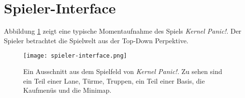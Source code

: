 \section{Spieler-Interface}
%
%
%
%
%
%
%
%
Abbildung \ref{fig:spieler-interface} zeigt eine typische Momentaufnahme des Spiels \textit{Kernel Panic!}.
Der Spieler betrachtet die Spielwelt aus der Top-Down Perpektive.
\begin{figure}[ht]
	\centering
	\texttt{[image: spieler-interface.png]}
  \caption{%
    Ein Ausschnitt aus dem Spielfeld von \emph{Kernel Panic!.} Zu sehen sind
    ein Teil einer Lane, Türme, Truppen, ein Teil einer Basis, die Kaufmenüs
    und die Minimap.}
	\label{fig:spieler-interface}
\end{figure}

